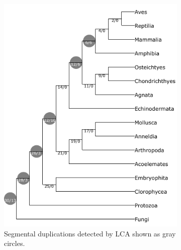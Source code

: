 \documentclass[10pt]{article}
\begin{document}
\begin{figure}[h!]
    \centering

    \begin{subfigure}[b]{0.48\textwidth}
        \centering
        \includegraphics[scale=0.7]{figs_shortversion/guigo_lca.pdf} %
        \caption{Segmental duplications detected by LCA shown as gray circles.}
        \label{fig:guigo-lca}
    \end{subfigure}
    \hfill
    \begin{subfigure}[b]{0.48\textwidth}
        \centering

\end{subfigure}
\end{figure}
\end{document}
